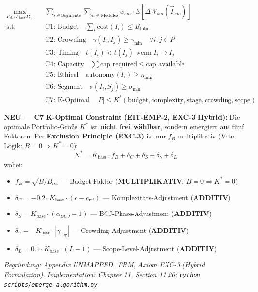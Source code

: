\begin{definition}
\label{def:20-hierarchical-optimization}
\begin{align}
\max_{P_{\text{str}}, P_{\text{tac}}, P_{\text{op}}} \quad & \sum_{s \in \text{Segments}} \sum_{m \in \text{Modules}} w_{sm} \cdot E[\Delta W_{sm}(\vec{I}_{sm})] \label{eq:20-hierarchical-obj}\\
\text{s.t.} \quad & \text{C1: Budget} \quad \sum_i \text{cost}(I_i) \leq B_{\text{total}} \label{eq:20-c1}\\
& \text{C2: Crowding} \quad \gamma(I_i, I_j) \geq \gamma_{\min} \quad \forall i,j \in P \label{eq:20-c2}\\
& \text{C3: Timing} \quad t(I_i) < t(I_j) \text{ wenn } I_i \rightarrow I_j \label{eq:20-c3}\\
& \text{C4: Capacity} \quad \sum \text{cap\_required} \leq \text{cap\_available} \label{eq:20-c4}\\
& \text{C5: Ethical} \quad \text{autonomy}(I_i) \geq \eta_{\min} \label{eq:20-c5}\\
& \text{C6: Segment} \quad \sigma(I_i, S_j) \geq \sigma_{\min} \label{eq:20-c6}\\
& \text{C7: K-Optimal} \quad |P| \leq K^*(\text{budget}, \text{complexity}, \text{stage}, \text{crowding}, \text{scope}) \label{eq:20-c7}
\end{align}
\end{definition}

\textbf{NEU --- C7 K-Optimal Constraint (EIT-EMP-2, EXC-3 Hybrid):} Die optimale Portfolio-Größe $K^*$ ist \textbf{nicht frei wählbar}, sondern emergiert aus fünf Faktoren. Per \textbf{Exclusion Principle (EXC-3)} ist nur $f_B$ multiplikativ (Veto-Logik: $B=0 \Rightarrow K^*=0$):
\begin{equation}
K^* = K_{\text{base}} \cdot f_B + \delta_C + \delta_S + \delta_\gamma + \delta_L
\label{eq:20-k-optimal}
\end{equation}
wobei:
\begin{itemize}[nosep]
\item $f_B = \sqrt{B/B_{\text{ref}}}$ --- Budget-Faktor (\textbf{MULTIPLIKATIV}: $B=0 \Rightarrow K^*=0$)
\item $\delta_C = -0.2 \cdot K_{\text{base}} \cdot (c - c_{\text{ref}})$ --- Komplexitäts-Adjustment (\textbf{ADDITIV})
\item $\delta_S = K_{\text{base}} \cdot (\alpha_{BCJ} - 1)$ --- BCJ-Phase-Adjustment (\textbf{ADDITIV})
\item $\delta_\gamma = -K_{\text{base}} \cdot |\bar{\gamma}_{\text{neg}}|$ --- Crowding-Adjustment (\textbf{ADDITIV})
\item $\delta_L = 0.1 \cdot K_{\text{base}} \cdot (L - 1)$ --- Scope-Level-Adjustment (\textbf{ADDITIV})
\end{itemize}
\textit{Begründung: Appendix UNMAPPED_FRM, Axiom EXC-3 (Hybrid Formulation).}
\textit{Implementation: Chapter 11, Section 11.20; \texttt{python scripts/emerge\_algorithm.py}}

